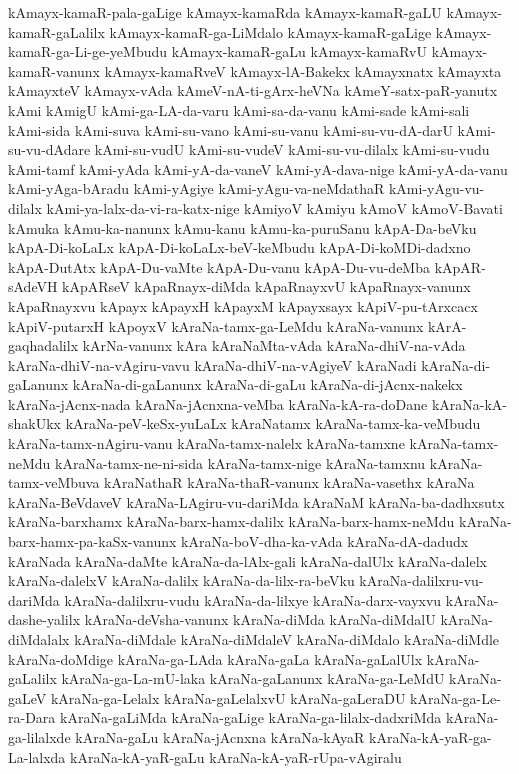 {kAmayx-kamaR-pala-gaLige
kAmayx-kamaRda
kAmayx-kamaR-gaLU
kAmayx-kamaR-gaLalilx
kAmayx-kamaR-ga-LiMdalo
kAmayx-kamaR-gaLige
kAmayx-kamaR-ga-Li-ge-yeMbudu
kAmayx-kamaR-gaLu
kAmayx-kamaRvU
kAmayx-kamaR-vanunx
kAmayx-kamaRveV
kAmayx-lA-Bakekx
kAmayxnatx
kAmayxta
kAmayxteV
kAmayx-vAda
kAmeV-nA-ti-gArx-heVNa
kAmeY-satx-paR-yanutx
kAmi
kAmigU
kAmi-ga-LA-da-varu
kAmi-sa-da-vanu
kAmi-sade
kAmi-sali
kAmi-sida
kAmi-suva
kAmi-su-vano
kAmi-su-vanu
kAmi-su-vu-dA-darU
kAmi-su-vu-dAdare
kAmi-su-vudU
kAmi-su-vudeV
kAmi-su-vu-dilalx
kAmi-su-vudu
kAmi-tamf
kAmi-yAda
kAmi-yA-da-vaneV
kAmi-yA-dava-nige
kAmi-yA-da-vanu
kAmi-yAga-bAradu
kAmi-yAgiye
kAmi-yAgu-va-neMdathaR
kAmi-yAgu-vu-dilalx
kAmi-ya-lalx-da-vi-ra-katx-nige
kAmiyoV
kAmiyu
kAmoV
kAmoV-Bavati
kAmuka
kAmu-ka-nanunx
kAmu-kanu
kAmu-ka-puruSanu
kApA-Da-beVku
kApA-Di-koLaLx
kApA-Di-koLaLx-beV-keMbudu
kApA-Di-koMDi-dadxno
kApA-DutAtx
kApA-Du-vaMte
kApA-Du-vanu
kApA-Du-vu-deMba
kApAR-sAdeVH
kApARseV
kApaRnayx-diMda
kApaRnayxvU
kApaRnayx-vanunx
kApaRnayxvu
kApayx
kApayxH
kApayxM
kApayxsayx
kApiV-pu-tArxcacx
kApiV-putarxH
kApoyxV
kAraNa-tamx-ga-LeMdu
kAraNa-vanunx
kArA-gaqhadalilx
kArNa-vanunx
kAra
kAraNaMta-vAda
kAraNa-dhiV-na-vAda
kAraNa-dhiV-na-vAgiru-vavu
kAraNa-dhiV-na-vAgiyeV
kAraNadi
kAraNa-di-gaLanunx
kAraNa-di-gaLanunx
kAraNa-di-gaLu
kAraNa-di-jAcnx-nakekx
kAraNa-jAcnx-nada
kAraNa-jAcnxna-veMba
kAraNa-kA-ra-doDane
kAraNa-kA-shakUkx
kAraNa-peV-keSx-yuLaLx
kAraNatamx
kAraNa-tamx-ka-veMbudu
kAraNa-tamx-nAgiru-vanu
kAraNa-tamx-nalelx
kAraNa-tamxne
kAraNa-tamx-neMdu
kAraNa-tamx-ne-ni-sida
kAraNa-tamx-nige
kAraNa-tamxnu
kAraNa-tamx-veMbuva
kAraNathaR
kAraNa-thaR-vanunx
kAraNa-vasethx
kAraNa
kAraNa-BeVdaveV
kAraNa-LAgiru-vu-dariMda
kAraNaM
kAraNa-ba-dadhxsutx
kAraNa-barxhamx
kAraNa-barx-hamx-dalilx
kAraNa-barx-hamx-neMdu
kAraNa-barx-hamx-pa-kaSx-vanunx
kAraNa-boV-dha-ka-vAda
kAraNa-dA-dadudx
kAraNada
kAraNa-daMte
kAraNa-da-lAlx-gali
kAraNa-dalUlx
kAraNa-dalelx
kAraNa-dalelxV
kAraNa-dalilx
kAraNa-da-lilx-ra-beVku
kAraNa-dalilxru-vu-dariMda
kAraNa-dalilxru-vudu
kAraNa-da-lilxye
kAraNa-darx-vayxvu
kAraNa-dashe-yalilx
kAraNa-deVsha-vanunx
kAraNa-diMda
kAraNa-diMdalU
kAraNa-diMdalalx
kAraNa-diMdale
kAraNa-diMdaleV
kAraNa-diMdalo
kAraNa-diMdle
kAraNa-doMdige
kAraNa-ga-LAda
kAraNa-gaLa
kAraNa-gaLalUlx
kAraNa-gaLalilx
kAraNa-ga-La-mU-laka
kAraNa-gaLanunx
kAraNa-ga-LeMdU
kAraNa-gaLeV
kAraNa-ga-Lelalx
kAraNa-gaLelalxvU
kAraNa-gaLeraDU
kAraNa-ga-Le-ra-Dara
kAraNa-gaLiMda
kAraNa-gaLige
kAraNa-ga-lilalx-dadxriMda
kAraNa-ga-lilalxde
kAraNa-gaLu
kAraNa-jAcnxna
kAraNa-kAyaR
kAraNa-kA-yaR-ga-La-lalxda
kAraNa-kA-yaR-gaLu
kAraNa-kA-yaR-rUpa-vAgiralu
}
